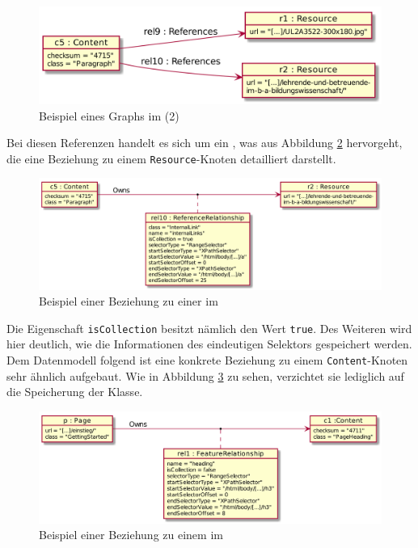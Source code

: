    \begin{figure}[htb]
        \centering
        \includegraphics[scale=\imageScalingFactor]{../resources/db-data-model/example/example_part2.png}
        \caption{Beispiel eines Graphs im {\classificationStorage} (2)}
        \label{image:dbDataModelExampleOverviewPart2}
    \end{figure}

    Bei diesen Referenzen handelt es sich um ein {\collectionFeature},
    was aus Abbildung \ref{image:dbDataModelExampleRel10} hervorgeht,
    die eine Beziehung zu einem \texttt{Resource}-Knoten detailliert darstellt.

    \begin{figure}[htb]
        \centering
        \includegraphics[scale=\imageScalingFactor]{../resources/db-data-model/example/c5-r2.png}
        \caption{Beispiel einer Beziehung zu einer {\resource} im {\classificationStorage}}
        \label{image:dbDataModelExampleRel10}
    \end{figure}

    Die Eigenschaft \texttt{isCollection} besitzt nämlich den Wert \texttt{true}.
    Des Weiteren wird hier deutlich, wie die Informationen des eindeutigen Selektors gespeichert werden.
    Dem Datenmodell folgend ist eine konkrete Beziehung zu einem \texttt{Content}-Knoten
    sehr ähnlich aufgebaut. Wie in Abbildung \ref{image:dbDataModelExampleRel1} zu sehen,
    verzichtet sie lediglich auf die Speicherung der Klasse.

    \begin{figure}[htb]
        \centering
        \includegraphics[scale=\imageScalingFactor]{../resources/db-data-model/example/p-c1.png}
        \caption{Beispiel einer Beziehung zu einem {\contentFeature} im {\classificationStorage}}
        \label{image:dbDataModelExampleRel1}
    \end{figure}
